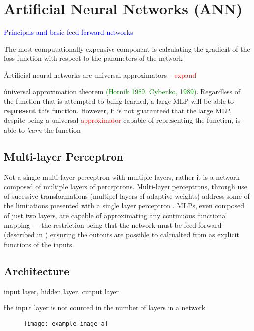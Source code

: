 \section{Artificial Neural Networks (ANN)}

\textcolor{blue}{Principals and basic feed forward networks}

\r{The most computationally expensive component is calculating the gradient of the loss function with respect to the parameters of the network}

\r{Artificial neural networks are {universal approximators} -- \textcolor{red}{expand}}

\r{universal approximation theorem \textcolor{green}{(Hornik 1989, Cybenko, 1989)}. Regardless of the function that is attempted to being learned, a large MLP will be able to \textbf{represent} this function. However, it is not guaranteed that the large MLP, despite being a universal \textcolor{red}{approximator} capable of representing the function, is able to \textit{learn} the function}

\subsection{Multi-layer Perceptron}

\r{Not a single multi-layer perceptron with multiple layers, rather it is a network composed of multiple layers of perceptrons. Multi-layer perceptrons, through use of sucessive transformations (multipel layers of adaptive weights) address some of the limitations presented with a single layer perceptron .  MLPs, even composed of just two layers, are capable of approximating any continuous functional mapping --- the restriction being that the network must be feed-forward (described in ) ensuring the outouts are possible to calcualted from as explicit functions of the inputs.}

\subsection{Architecture}

\r{{input layer}, {hidden layer}, {output layer}}

\r{the input layer is not counted in the number of layers in a network}

\begin{figure}[htp]
	\centering
	\texttt{[image: example-image-a]}\hfil
	\caption{}
	\label{fig:foundations_ann_overview}
\end{figure}



